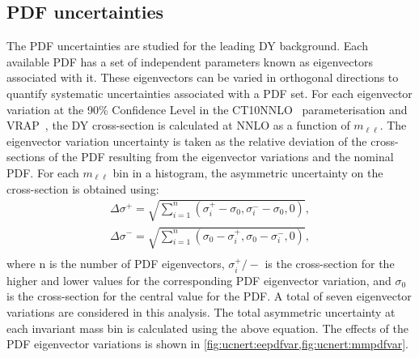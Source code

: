 \subsection{PDF uncertainties}
The PDF uncertainties are studied for the leading DY background. Each available PDF has a set of independent parameters known as eigenvectors associated with it. These eigenvectors can be varied in orthogonal directions to quantify systematic uncertainties associated with a PDF set. For each eigenvector variation at the 90\% Confidence Level in the CT10NNLO~\cite{ct10} parameterisation and {\textsc{VRAP}}~\cite{vrap}, the DY cross-section is calculated at NNLO as a function of $m_{\ell\ell}$. The eigenvector variation uncertainty is taken as the relative deviation of the cross-sections of the PDF resulting from the eigenvector variations and the nominal PDF. For each $m_{\ell\ell}$ bin in a histogram, the asymmetric uncertainty on the cross-section is obtained using:
\begin{equation}
    \begin{aligned}
    \Delta \sigma^+ = \sqrt{\sum^n_{i=1}\left(\sigma_i^+ - \sigma_0, \sigma^-_i - \sigma_0,0     \right)}, \\
    \Delta \sigma^- = \sqrt{\sum^n_{i=1}\left(\sigma_0 - \sigma_i^+, \sigma_0 -\sigma^-_i,0  \right)}, \\
    \end{aligned}
\end{equation}
where n is the number of PDF eigenvectors, $\sigma_i^+/-$ is the cross-section for the higher and lower values for the corresponding PDF eigenvector variation, and $\sigma_0$ is the cross-section for the central value for the PDF. A total of seven eigenvector variations are considered in this analysis. The total asymmetric uncertainty at each invariant mass bin is calculated using the above equation. The effects of the PDF eigenvector variations is shown in \cref{fig:ucnert:eepdfvar,fig:ucnert:mmpdfvar}.

